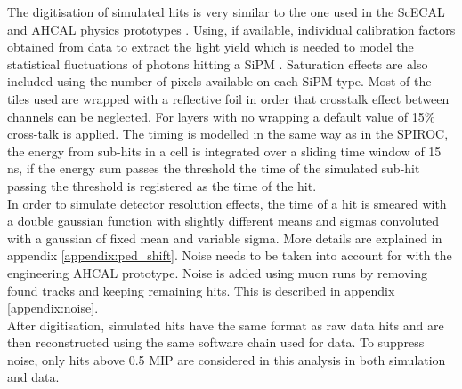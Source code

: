 The digitisation of simulated hits is very similar to the one used in the ScECAL and AHCAL physics prototypes \cite{2011_JINST_6_P04003}. Using, if available, individual calibration factors obtained from data to extract the light yield which is needed to model the statistical fluctuations of photons hitting a SiPM \cite{Hartbrich:2016bbz}. Saturation effects are also included using the number of pixels available on each SiPM type. Most of the tiles used are wrapped with a reflective foil in order that crosstalk effect between channels can be neglected. For layers with no wrapping a default value of 15\% cross-talk is applied. The timing is modelled in the same way as in the SPIROC, the energy from sub-hits in a cell is integrated over a sliding time window of 15 ns, if the energy sum passes the threshold the time of the simulated sub-hit passing the threshold is registered as the time of the hit.\\

In order to simulate detector resolution effects, the time of a hit is smeared with a double gaussian function with slightly different means and sigmas convoluted with a gaussian of fixed mean and variable sigma. More details are explained in appendix \ref{appendix:ped_shift}. Noise needs to be taken into account for with the engineering AHCAL prototype. Noise is added using muon runs by removing found tracks and keeping remaining hits. This is described in appendix \ref{appendix:noise}.\\

After digitisation, simulated hits have the same format as raw data hits and are then reconstructed using the same software chain used for data. To suppress noise, only hits above 0.5 MIP are considered in this analysis in both simulation and data.
